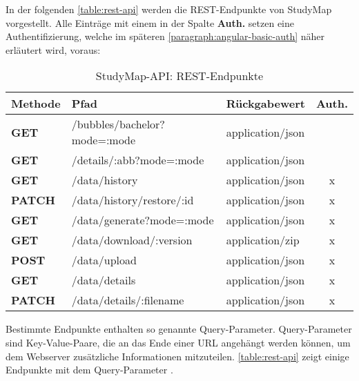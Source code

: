 \noindent
In der folgenden \autoref{table:rest-api} werden die REST-Endpunkte von StudyMap vorgestellt. Alle Einträge mit einem  in der Spalte \textbf{Auth.} setzen eine Authentifizierung, welche im späteren \autoref{paragraph:angular-basic-auth} näher erläutert wird, voraus:
\begin{table}[!ht]
    \centering
    \begin{tabular}{|l|l|l|c|}
    \hline
    \textbf{Methode} & \textbf{Pfad}                & \textbf{Rückgabewert} & \multicolumn{1}{l|}{\textbf{Auth.}} \\ \hline
    \textbf{GET}     & /bubbles/bachelor?mode=:mode & application/json      &                                     \\ \hline
    \textbf{GET}     & /details/:abb?mode=:mode     & application/json      &                                     \\ \hline
    \textbf{GET}     & /data/history                & application/json      & x                                   \\ \hline
    \textbf{PATCH}   & /data/history/restore/:id    & application/json      & x                                   \\ \hline
    \textbf{GET}     & /data/generate?mode=:mode    & application/json      & x                                   \\ \hline
    \textbf{GET}     & /data/download/:version      & application/zip       & x                                   \\ \hline
    \textbf{POST}    & /data/upload                 & application/json      & x                                   \\ \hline
    \textbf{GET}     & /data/details                & application/json      & x                                   \\ \hline
    \textbf{PATCH}   & /data/details/:filename      & application/json      & x                                   \\ \hline
    \end{tabular}

    \caption{StudyMap-API: REST-Endpunkte}
    \label{table:rest-api}
\end{table}

Bestimmte Endpunkte enthalten so genannte Query-Parameter. Query-Parameter sind Key-Value-Paare, die an das Ende einer URL angehängt werden können, um dem Webserver zusätzliche Informationen mitzuteilen. \parencite{branch_query_2024} \autoref{table:rest-api} zeigt einige Endpunkte mit dem Query-Parameter .

